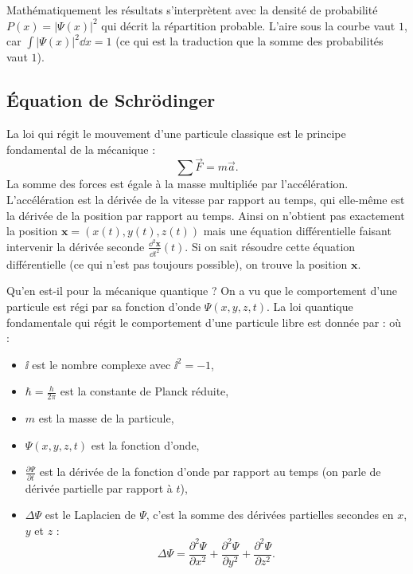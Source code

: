 \documentclass[11pt,class=report,crop=false]{standalone}
\begin{document}

Mathématiquement les résultats s'interprètent avec la densité de probabilité $P(x) = \left| \Psi(x) \right|^2$ qui décrit la répartition probable. L'aire sous la courbe vaut $1$, car $\int \left| \Psi(x) \right|^2 \dd x = 1$ (ce qui est la traduction que la somme des probabilités vaut $1$).



\subsection{Équation de Schrödinger}

La loi qui régit le mouvement d'une particule classique est le principe fondamental de la mécanique :
$$\sum \vec F = m \vec a.$$
La somme des forces est égale à la masse multipliée par l'accélération.
L'accélération est la dérivée de la vitesse par rapport au temps, qui elle-même est la dérivée de la position par rapport au temps.
Ainsi on n'obtient pas exactement la position $\mathbf{x} = (x(t),y(t),z(t))$  mais une équation différentielle faisant intervenir la dérivée seconde $\frac{\dd^2 \mathbf x}{\dd t^2}(t)$. Si on sait résoudre cette équation différentielle (ce qui n'est pas toujours possible), on trouve la position $\mathbf{x}$.

\bigskip

Qu'en est-il pour la mécanique quantique ?
On a vu que le comportement d'une particule est régi par sa fonction d'onde $\Psi(x,y,z,t)$.
La loi quantique fondamentale qui régit le comportement d'une particule libre est donnée par  :
où :
\begin{itemize}
  \item $\ii$ est le nombre complexe avec $\ii^2 = -1$,
  \item $\hbar = \frac{h}{2\pi}$ est la constante de Planck réduite,
  \item $m$ est la masse de la particule,
  \item $\Psi(x,y,z,t)$ est la fonction d'onde,
  \item $\frac{\partial \Psi}{\partial t}$ est la dérivée de la fonction d'onde par rapport au temps (on parle de dérivée partielle par rapport à $t$),
  \item $\Delta \Psi$ est le Laplacien de $\Psi$, c'est la somme des dérivées partielles secondes en $x$, $y$ et $z$ :
$$\Delta \Psi = \frac{\partial^2 \Psi}{\partial x^2} + \frac{\partial^2 \Psi}{\partial y^2} + \frac{\partial^2 \Psi}{\partial z^2}.$$
\end{itemize}
\end{document}
